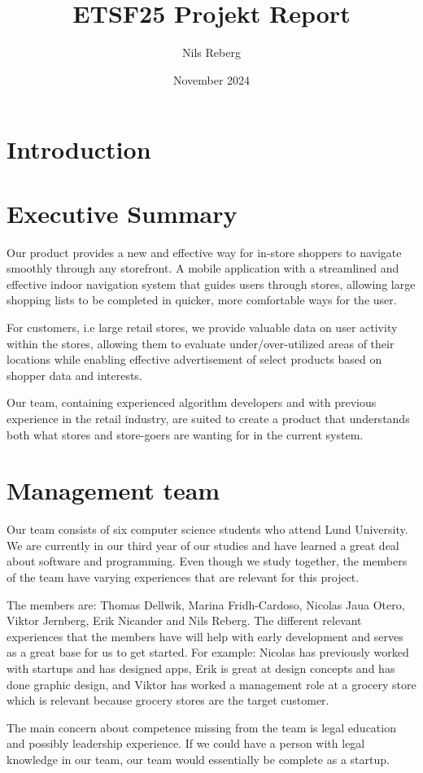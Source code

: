 \documentclass{article}
\title{ETSF25 Projekt Report}
\author{Nils Reberg\\
}
\date{November 2024}
\begin{document}
\maketitle

\section{Introduction}
\newpage
\section{Executive Summary}
Our product provides a new and effective way for in-store shoppers to navigate smoothly through any storefront. A mobile application with a streamlined and effective indoor navigation system that guides users through stores, allowing large shopping lists to be completed in quicker, more comfortable ways for the user. 

For customers, i.e large retail stores, we provide valuable data on user activity within the stores, allowing them to evaluate under/over-utilized areas of their locations while enabling effective advertisement of select products based on shopper data and interests. 

Our team, containing experienced algorithm developers and with previous experience in the retail industry, are suited to create a product that understands both what stores and store-goers are wanting for in the current system.

\section{Management team}
Our team consists of six computer science students who attend Lund University. We are currently in our third year of our studies and have learned a great deal about software and programming. Even though we study together, the members of the team have varying experiences that are relevant for this project.

The members are: Thomas Dellwik, Marina Fridh-Cardoso, Nicolas Jaua Otero, Viktor Jernberg, Erik Nicander and Nils Reberg. The different relevant experiences that the members have will help with early development and serves as a great base for us to get started. For example: Nicolas has previously worked with startups and has designed apps, Erik is great at design concepts and has done graphic design, and Viktor has worked a management role at a grocery store which is relevant because grocery stores are the target customer.

The main concern about competence missing from the team  is legal education and possibly leadership experience. If we could have a person with legal knowledge in our team, our team would essentially be complete as a startup.
\end{document}
